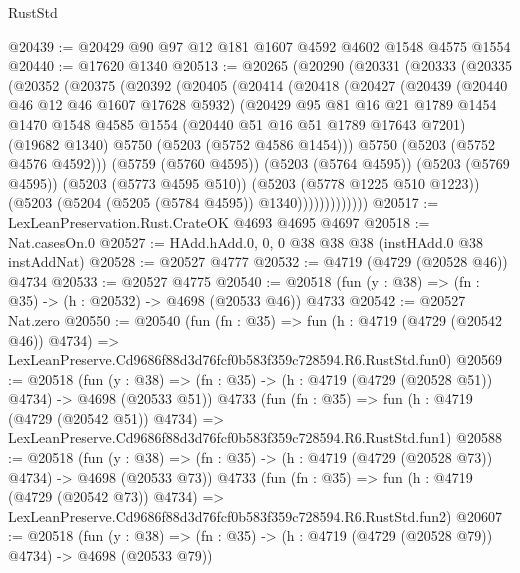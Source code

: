 \begin{lexlean}{RustStd}
\begin{coremodule}
@20439 := @20429 @90 @97 @12 @181 @1607 @4592 @4602 @1548 @4575 @1554
@20440 := @17620 @1340
@20513 := @20265
    (@20290
      (@20331
        (@20333
          (@20335
            (@20352
              (@20375
                (@20392
                  (@20405
                    (@20414
                      (@20418
                        (@20427
                          (@20439
                            (@20440 @46 @12 @46 @1607 @17628 @5932)
                            (@20429
                              @95
                              @81
                              @16
                              @21
                              @1789
                              @1454
                              @1470
                              @1548
                              @4585
                              @1554
                              (@20440 @51 @16 @51 @1789 @17643 @7201)
                              (@19682 @1340)
                              @5750
                              (@5203 (@5752 @4586 @1454)))
                            @5750
                            (@5203 (@5752 @4576 @4592)))
                          (@5759 (@5760 @4595))
                          (@5203 (@5764 @4595))
                          (@5203 (@5769 @4595))
                          (@5203 (@5773 @4595 @510))
                          (@5203 (@5778 @1225 @510 @1223))
                          (@5203 (@5204 (@5205 (@5784 @4595)) @1340)))))))))))))
@20517 := LexLeanPreservation.Rust.CrateOK @4693 @4695 @4697
@20518 := Nat.casesOn.{0}
@20527 := HAdd.hAdd.{0, 0, 0} @38 @38 @38 (instHAdd.{0} @38 instAddNat)
@20528 := @20527 @4777
@20532 := @4719 (@4729 (@20528 @46)) @4734
@20533 := @20527 @4775
@20540 := @20518 (fun (y : @38) => (fn : @35) -> (h : @20532) -> @4698 (@20533 @46)) @4733
@20542 := @20527 Nat.zero
@20550 := @20540
    (fun (fn : @35) =>
    fun (h : @4719 (@4729 (@20542 @46)) @4734) =>
    LexLeanPreserve.Cd9686f88d3d76fcf0b583f359c728594.R6.RustStd.fun0)
@20569 := @20518
    (fun (y : @38) => (fn : @35) -> (h : @4719 (@4729 (@20528 @51)) @4734) -> @4698 (@20533 @51))
    @4733
    (fun (fn : @35) =>
    fun (h : @4719 (@4729 (@20542 @51)) @4734) =>
    LexLeanPreserve.Cd9686f88d3d76fcf0b583f359c728594.R6.RustStd.fun1)
@20588 := @20518
    (fun (y : @38) => (fn : @35) -> (h : @4719 (@4729 (@20528 @73)) @4734) -> @4698 (@20533 @73))
    @4733
    (fun (fn : @35) =>
    fun (h : @4719 (@4729 (@20542 @73)) @4734) =>
    LexLeanPreserve.Cd9686f88d3d76fcf0b583f359c728594.R6.RustStd.fun2)
@20607 := @20518
    (fun (y : @38) => (fn : @35) -> (h : @4719 (@4729 (@20528 @79)) @4734) -> @4698 (@20533 @79))

\end{coremodule}
\end{lexlean}
